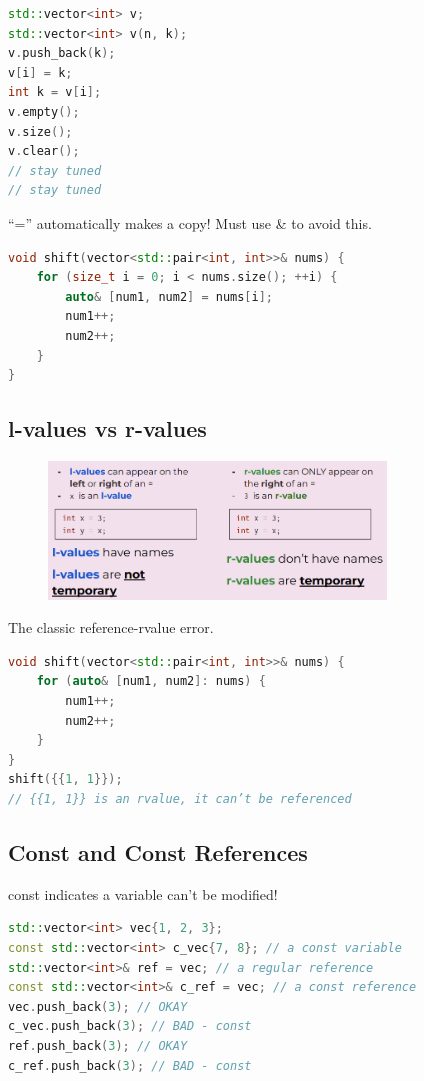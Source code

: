 \documentclass[12pt, a4paper, oneside]{ctexbook}
\begin{document}
\begin{lstlisting}[language=c++]
std::vector<int> v;
std::vector<int> v(n, k);
v.push_back(k);
v[i] = k;
int k = v[i];
v.empty();
v.size();
v.clear();
// stay tuned
// stay tuned
\end{lstlisting}

“=” automatically makes
a copy! Must use \& to
avoid this.

\begin{lstlisting}[language=c++]
void shift(vector<std::pair<int, int>>& nums) {
    for (size_t i = 0; i < nums.size(); ++i) {
        auto& [num1, num2] = nums[i];
        num1++;
        num2++;
    }
}
\end{lstlisting}


\subsection{l-values vs r-values}

  \begin{figure}[ht]
		\centering 
		\includegraphics[width=0.8\textwidth]{images3.png} 
	\end{figure}


The classic reference-rvalue error.

\begin{lstlisting}[language=c++]
void shift(vector<std::pair<int, int>>& nums) {
    for (auto& [num1, num2]: nums) {
        num1++;
        num2++;
    }
}
shift({{1, 1}});
// {{1, 1}} is an rvalue, it can’t be referenced
\end{lstlisting}

\subsection{Const and Const References}

const indicates a variable can’t be modified!

\begin{lstlisting}[language=c++]
std::vector<int> vec{1, 2, 3};
const std::vector<int> c_vec{7, 8}; // a const variable
std::vector<int>& ref = vec; // a regular reference
const std::vector<int>& c_ref = vec; // a const reference
vec.push_back(3); // OKAY
c_vec.push_back(3); // BAD - const
ref.push_back(3); // OKAY
c_ref.push_back(3); // BAD - const
\end{lstlisting}
\end{document}
